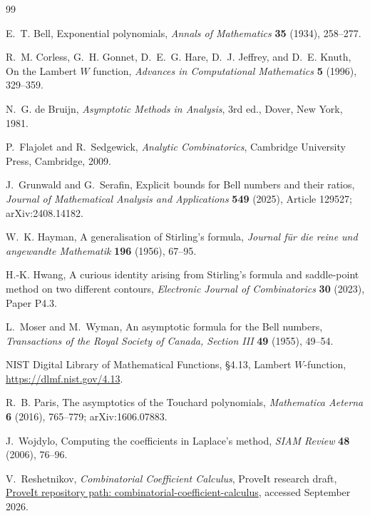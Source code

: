 \documentclass[11pt,a4paper]{article}
\theoremstyle{definition}
\begin{document}
\begin{thebibliography}{99}

E.~T. Bell,
\newblock Exponential polynomials,
\newblock \emph{Annals of Mathematics} \textbf{35} (1934), 258--277.

R.~M. Corless, G.~H. Gonnet, D.~E.~G. Hare, D.~J. Jeffrey, and D.~E. Knuth,
\newblock On the Lambert $W$ function,
\newblock \emph{Advances in Computational Mathematics} \textbf{5} (1996),
329--359.

N.~G. de Bruijn,
\newblock \emph{Asymptotic Methods in Analysis},
\newblock 3rd ed., Dover, New York, 1981.

P.~Flajolet and R.~Sedgewick,
\newblock \emph{Analytic Combinatorics},
\newblock Cambridge University Press, Cambridge, 2009.

J.~Grunwald and G.~Serafin,
\newblock Explicit bounds for Bell numbers and their ratios,
\newblock \emph{Journal of Mathematical Analysis and Applications}
\textbf{549} (2025), Article 129527; arXiv:2408.14182.

W.~K. Hayman,
\newblock A generalisation of Stirling's formula,
\newblock \emph{Journal f\"ur die reine und angewandte Mathematik}
\textbf{196} (1956), 67--95.

H.-K. Hwang,
\newblock A curious identity arising from Stirling's formula and saddle-point
method on two different contours,
\newblock \emph{Electronic Journal of Combinatorics} \textbf{30} (2023),
Paper P4.3.

L.~Moser and M.~Wyman,
\newblock An asymptotic formula for the Bell numbers,
\newblock \emph{Transactions of the Royal Society of Canada, Section III}
\textbf{49} (1955), 49--54.

NIST Digital Library of Mathematical Functions,
\newblock \S4.13, Lambert $W$-function,
\newblock \url{https://dlmf.nist.gov/4.13}.

R.~B. Paris,
\newblock The asymptotics of the Touchard polynomials,
\newblock \emph{Mathematica Aeterna} \textbf{6} (2016), 765--779;
arXiv:1606.07883.

J.~Wojdylo,
\newblock Computing the coefficients in Laplace's method,
\newblock \emph{SIAM Review} \textbf{48} (2006), 76--96.

V.~Reshetnikov,
\newblock \emph{Combinatorial Coefficient Calculus}, ProveIt research draft,
\newblock \href{https://github.com/VladimirReshetnikov/ProveIt/tree/main/Analysis/FabiusFunction/docs/semi-formalized-research-frontiers/drafts/combinatorial-coefficient-calculus/Combinatorial_Coefficient_Calculus}{ProveIt repository path: combinatorial-coefficient-calculus}, accessed September 2026.


\end{thebibliography}
\end{document}
